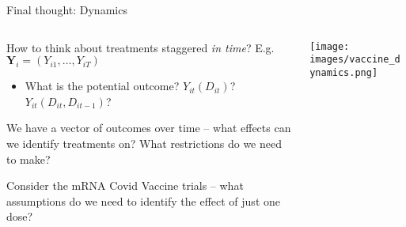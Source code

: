 \documentclass[notes,11pt, aspectratio=169]{beamer}
\newenvironment{wideitemize}{\itemize\addtolength{\itemsep}{10pt}}{\enditemize}
\begin{document}
\begin{frame}{Final thought: Dynamics}
\begin{columns}[T] %
  \begin{column}{.5\textwidth}
    \begin{wideitemize}
    \item How to think about treatments staggered \emph{in time}? E.g. $\mathbf{Y}_{i} = (Y_{i1}, \ldots, Y_{iT})$
      \begin{itemize}
      \item What is the potential outcome? $Y_{it}(D_{it})$?  $Y_{it}(D_{it}, D_{it-1})$? 
      \end{itemize}
    \item We have a vector of outcomes over time -- what effects can we identify treatments on? What restrictions do we need to make?
    \item Consider the mRNA Covid Vaccine trials -- what assumptions do we need to identify the effect of just one dose?
    \end{wideitemize}
  \end{column}%
  \hfill%
  \begin{column}{.5\textwidth}
    \begin{center}
        \texttt{[image: images/vaccine\_dynamics.png]}
    \end{center}
  \end{column}
\end{columns}

\end{frame}
\end{document}
